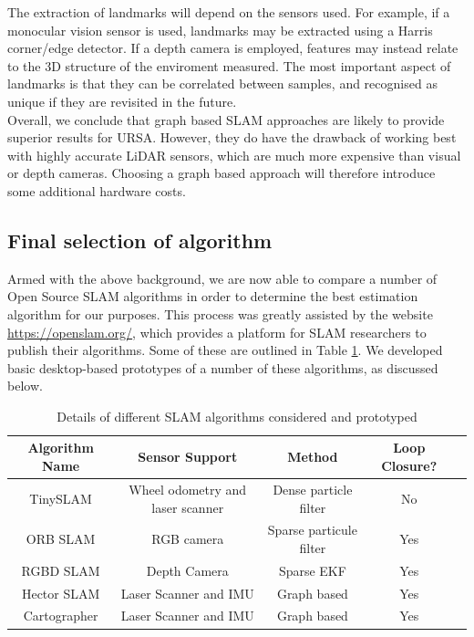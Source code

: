 \documentclass[capstone_report.tex]{subfiles}
\begin{document}
    The extraction of landmarks will depend on the sensors used. For example, if a monocular vision sensor is used, landmarks may be extracted using a Harris corner/edge detector. If a depth camera is employed, features may instead relate to the 3D structure of the enviroment measured. The most important aspect of landmarks is that they can be correlated between samples, and recognised as unique if they are revisited in the future.\\

    



	Overall, we conclude that graph based SLAM approaches are likely to provide superior results for URSA. However, they do have the drawback of working best with highly accurate LiDAR sensors, which are much more expensive than visual or depth cameras. Choosing a graph based approach will therefore introduce some additional hardware costs.

	\subsection{Final selection of algorithm}
	Armed with the above background, we are now able to compare a number of Open Source SLAM algorithms in order to determine the best estimation algorithm for our purposes. This process was greatly assisted by the website \url{https://openslam.org/}, which provides a platform for SLAM researchers to publish their algorithms. Some of these are outlined in Table \ref{tab:slamAlg}. We developed basic desktop-based prototypes of a number of these algorithms, as discussed below.

	\begin{table}[H]
		\centering
	 	\begin{tabular}{|c|c|c|c|c|}
	 		\hline
	 		\bf{Algorithm Name}	&	\bf{Sensor Support}	&	\bf{Method}	&	\bf{Loop Closure?}\\
	 		\hline
	 		TinySLAM		&	Wheel odometry and laser scanner	&	Dense particle filter &	No\\	
	 		\hline
	 		ORB SLAM 	&		RGB camera & Sparse particule filter & Yes \\
	 		\hline
	 		RGBD SLAM & Depth Camera & Sparse EKF & Yes\\
	 		\hline
	 		Hector SLAM & Laser Scanner and IMU & Graph based & Yes\\
	 		\hline
	 		Cartographer & Laser Scanner and IMU & Graph based & Yes\\
	 		\hline
	 	\end{tabular}
	 	\caption{Details of different SLAM algorithms considered and prototyped\label{tab:slamAlg}}
	\end{table}
\end{document}
